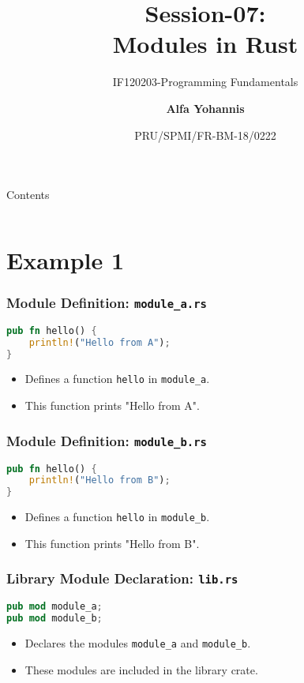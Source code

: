 \documentclass[aspectratio=169, table]{beamer}
\subtitle{IF120203-Programming Fundamentals}
\title{Session-07:\\\LARGE{Modules in Rust}\\ \vspace{10pt}}
\date[Serial]{\scriptsize {PRU/SPMI/FR-BM-18/0222}}
\author[Pradita]{\small{\textbf{Alfa Yohannis}}}
\begin{document}
\frame{\titlepage}

\begin{frame}{Contents}
\vspace{15pt}
\begin{columns}[t]
\begin{column}{.5\textwidth}
	\tableofcontents[sections={1-12}]
\end{column}
\begin{column}{.5\textwidth}
	\tableofcontents[sections={13-24}]
\end{column}
\end{columns}
\end{frame}

\section{Example 1}
\begin{frame}[fragile]
\frametitle{Module Definition: \texttt{module\_a.rs}}
\begin{lstlisting}[language=Rust]
pub fn hello() {
	println!("Hello from A"); 
}
\end{lstlisting}
\begin{itemize}
\item Defines a function \texttt{hello} in \texttt{module\_a}.
\item This function prints "Hello from A".
\end{itemize}
\end{frame}

\begin{frame}[fragile]
\frametitle{Module Definition: \texttt{module\_b.rs}}
\begin{lstlisting}[language=Rust]
pub fn hello() {
	println!("Hello from B");
}
\end{lstlisting}
\begin{itemize}
\item Defines a function \texttt{hello} in \texttt{module\_b}.
\item This function prints "Hello from B".
\end{itemize}
\end{frame}

\begin{frame}[fragile]
\frametitle{Library Module Declaration: \texttt{lib.rs}}
\begin{lstlisting}[language=Rust]
pub mod module_a; 
pub mod module_b; 
\end{lstlisting}
\begin{itemize}
\item Declares the modules \texttt{module\_a} and \texttt{module\_b}.
\item These modules are included in the library crate.
\end{itemize}
\end{frame}
\end{document}
